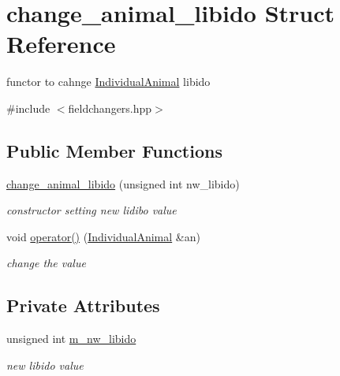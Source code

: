 \hypertarget{structchange__animal__libido}{
\section{change\_\-animal\_\-libido Struct Reference}
\label{structchange__animal__libido}
}


functor to cahnge \hyperlink{classIndividualAnimal}{IndividualAnimal} libido  




{\ttfamily \#include $<$fieldchangers.hpp$>$}

\subsection*{Public Member Functions}
\begin{DoxyCompactItemize}
\item 
\hypertarget{structchange__animal__libido_a5896ac98df3c0d22bf73b154dbdf57e0}{
\hyperlink{structchange__animal__libido_a5896ac98df3c0d22bf73b154dbdf57e0}{change\_\-animal\_\-libido} (unsigned int nw\_\-libido)}
\label{structchange__animal__libido_a5896ac98df3c0d22bf73b154dbdf57e0}

\begin{DoxyCompactList}\small\item\em constructor setting new lidibo value \end{DoxyCompactList}\item 
\hypertarget{structchange__animal__libido_a209427500e96b2d1a177652d190d3660}{
void \hyperlink{structchange__animal__libido_a209427500e96b2d1a177652d190d3660}{operator()} (\hyperlink{classIndividualAnimal}{IndividualAnimal} \&an)}
\label{structchange__animal__libido_a209427500e96b2d1a177652d190d3660}

\begin{DoxyCompactList}\small\item\em change the value \end{DoxyCompactList}\end{DoxyCompactItemize}
\subsection*{Private Attributes}
\begin{DoxyCompactItemize}
\item 
\hypertarget{structchange__animal__libido_aef574a4444ac35696592fb1d04a8985d}{
unsigned int \hyperlink{structchange__animal__libido_aef574a4444ac35696592fb1d04a8985d}{m\_\-nw\_\-libido}}
\label{structchange__animal__libido_aef574a4444ac35696592fb1d04a8985d}

\begin{DoxyCompactList}\small\item\em new libido value \end{DoxyCompactList}\end{DoxyCompactItemize}


